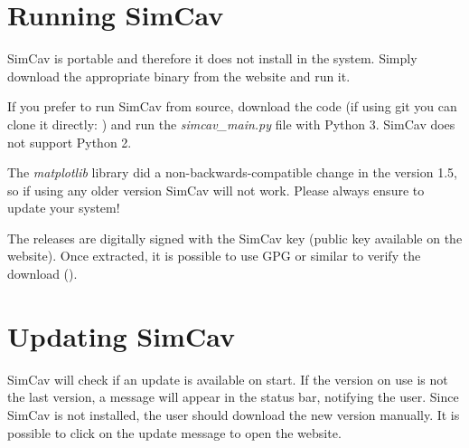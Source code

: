 \documentclass[11pt,a4paper,article,oneside]{memoir}
\begin{document}
	\section{Running SimCav}
	SimCav is portable and therefore it does not install in the system. Simply download the appropriate binary from the website and run it.
	
	If you prefer to run SimCav from source, download the code (if using git you can clone it directly: ) and run the \textit{simcav\_main.py} file with Python 3. SimCav does not support Python 2. 
	
	The \textit{matplotlib} library did a non-backwards-compatible change in the version 1.5, so if using any older version SimCav will not work. Please always ensure to update your system!
	
	The releases are digitally signed with the SimCav key (public key available on the website). Once extracted, it is possible to use GPG or similar to verify the download ().
	
	\section{Updating SimCav}
	SimCav will check if an update is available on start. If the version on use is not the last version, a message will appear in the status bar, notifying the user. Since SimCav is not installed, the user should download the new version manually. It is possible to click on the update message to open the website.
		
	
\end{document}
